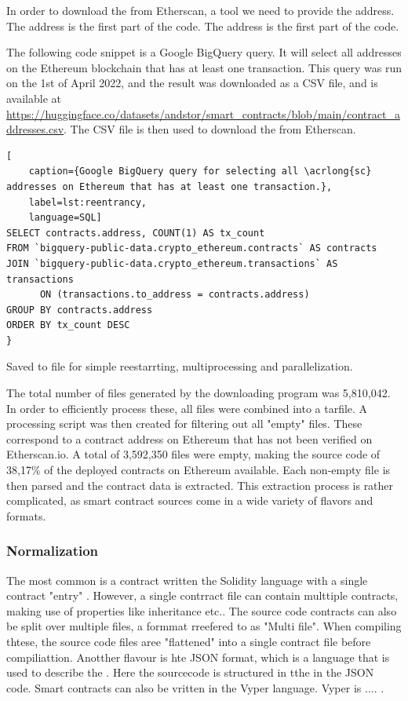 In order to download the  from Etherscan, a tool we need to provide the  address. The address is the first part of the  code. The address is the first part of the  code.

The following code snippet is a Google BigQuery query. It will select all  addresses on the Ethereum blockchain that has at least one transaction. This query was run on the 1st of April 2022, and the result was downloaded as a CSV file, and is available at \url{https://huggingface.co/datasets/andstor/smart_contracts/blob/main/contract_addresses.csv}. The CSV file is then used to download the  from Etherscan.

\begin{lstlisting}[
    caption={Google BigQuery query for selecting all \acrlong{sc} addresses on Ethereum that has at least one transaction.},
    label=lst:reentrancy,
    language=SQL]
SELECT contracts.address, COUNT(1) AS tx_count
FROM `bigquery-public-data.crypto_ethereum.contracts` AS contracts
JOIN `bigquery-public-data.crypto_ethereum.transactions` AS transactions 
      ON (transactions.to_address = contracts.address)
GROUP BY contracts.address
ORDER BY tx_count DESC
}
\end{lstlisting}

Saved to file for simple reestarrting, multiprocessing and parallelization.

The total number of files generated by the downloading program was 5,810,042. In order to efficiently process these, all files were combined into a tarfile. A processing script was then created for filtering out all "empty" files. These correspond to a contract address on Ethereum that has not been verified on Etherscan.io. A total of 3,592,350 files were empty, making the source code of 38,17\% of the deployed contracts on Ethereum available. Each non-empty file is then parsed and the contract data is extracted. This extraction process is rather complicated, as smart contract sources come in a wide variety of flavors and formats.

\subsubsection{Normalization}
The most common is a contract written the Solidity language with  a single contract "entry"  . However, a single contrract file can contain multtiple contracts, making use of properties like inheritance etc.. The source code contracts can also be split over multiple files, a formmat rreefered to as "Multi file". When compiling thtese, the source code files aree "flattened" into a single contract file before compiliattion. Anotther flavour is hte JSON format, which is a language that is used to describe the . Here the sourcecode is structured in tthe in the JSON code. Smart contracts can also be vritten in the Vyper language. Vyper is .... .


